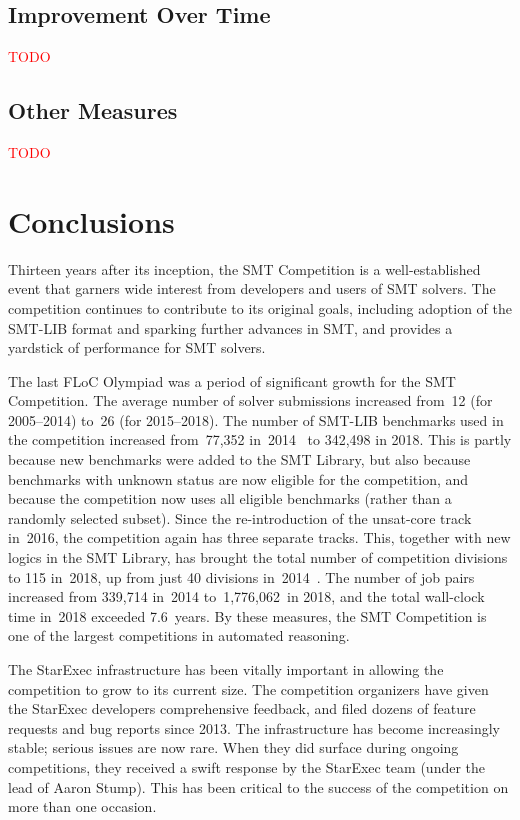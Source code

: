 \documentclass[twoside,11pt]{article}
\newcommand{\TODO}[0]{\textcolor{red}{TODO}}
\begin{document}
\subsection{Improvement Over Time}

\TODO

\subsection{Other Measures}

\TODO


\section{Conclusions}
\label{sec:conclusions}

Thirteen years after its inception, the SMT Competition is a
well-established event that garners wide interest from developers and
users of SMT solvers.  The competition continues to contribute to its
original goals, including adoption of the SMT-LIB format and sparking
further advances in SMT, and provides a yardstick of performance for
SMT solvers.

The last FLoC Olympiad was a period of significant growth for the SMT
Competition.  The average number of solver submissions increased
from~12 (for 2005--2014) to~26 (for 2015--2018).  The number of
SMT-LIB benchmarks used in the competition increased from~77,352
in~2014~\cite{CDW14} to 342,498 in 2018.  This is partly because new
benchmarks were added to the SMT Library, but also because benchmarks
with unknown status are now eligible for the competition, and because
the competition now uses all eligible benchmarks (rather than a
randomly selected subset).  Since the re-introduction of the
unsat-core track in~2016, the competition again has three separate
tracks.  This, together with new logics in the SMT Library, has
brought the total number of competition divisions to 115 in~2018, up
from just 40 divisions in~2014~\cite{CDW14}.  The number of job pairs
increased from 339,714 in~2014 to~1,776,062~in 2018, and the total
wall-clock time in~2018 exceeded 7.6~years.  By these measures, the
SMT Competition is one of the largest competitions in automated
reasoning.

The StarExec infrastructure has been vitally important in allowing the
competition to grow to its current size.  The competition organizers
have given the StarExec developers comprehensive feedback, and filed
dozens of feature requests and bug reports since 2013.  The
infrastructure has become increasingly stable; serious issues are now
rare.  When they did surface during ongoing competitions, they
received a swift response by the StarExec team (under the lead of
Aaron Stump).  This has been critical to the success of the
competition on more than one occasion.
\end{document}
